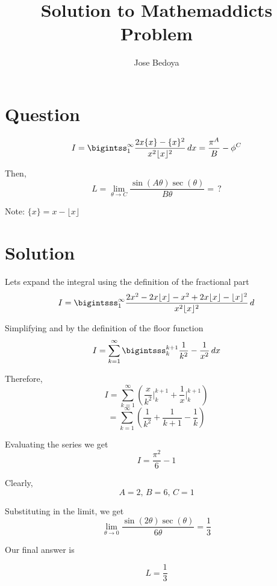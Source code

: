 \documentclass{article}
\begin{document}
\pagecolor{Blue}
\title{Solution to Mathemaddict\textsc{}s Problem}
\author{Jose Bedoya}
\maketitle
\section{Question}
{\LARGE
$$I=\bigintss_{1}^{\infty} \frac{2x\{x\}-\{x\}^2}{x^2\lfloor x\rfloor^2}\,dx=\frac{\pi^A}{B}-\phi^C$$

\vspace{4mm}
Then,
$$L=\lim_{\theta\to C} \frac{\sin\left(A\theta\right)\sec \left(\theta\right)}{B\theta}=\,?$$

\vspace{3mm}
Note: $\{x\}=x-\lfloor x\rfloor$
}
\section{Solution}
{\Large
Let\textsc{}s expand the integral using the definition of the fractional part
$$I=\bigintsss_{1}^{\infty}\frac{2x^2-2x\lfloor x\rfloor-x^2+2x\lfloor x\rfloor-\lfloor x\rfloor^2}{x^2\lfloor x\rfloor^2}\,d $$

\vspace{5mm}
Simplifying and by the definition of the floor function 
$$I=\sum_{k=1}^{\infty}\bigintsss_{k}^{k+1}\frac{1}{k^2}-\frac{1}{x^2}\,dx$$

\vspace{4mm}
Therefore,
\newpage
$$I=\sum_{k=1}^{\infty}\left(\frac{x}{k^2}\Big|_k^{k+1}+\frac{1}{x}\Big|_k^{k+1}\right)$$
$$=\sum_{k=1}^{\infty}\left(\frac{1}{k^2}+\frac{1}{k+1}-\frac{1}{k}\right)$$

\vspace{3mm}
Evaluating the series we get
$$I=\frac{\pi^2}{6}-1$$

\vspace{3mm}
Clearly,
$$A=2,\,B=6,\, C=1$$

\vspace{5mm}
Substituting in the limit, we get
$$\lim_{\theta\to0} \frac{\sin\left(2\theta\right)\sec\left(\theta\right)}{6\theta}=\frac{1}{3}$$

\vspace{3mm}
Our final answer is
}
{\LARGE
$$L=\frac{1}{3}$$
}
\end{document}
